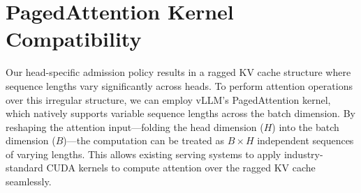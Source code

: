 \section{PagedAttention Kernel Compatibility}
\label{app:kernel}

Our head-specific admission policy results in a ragged KV cache structure where sequence lengths vary significantly across heads. To perform attention operations over this irregular structure, we can employ vLLM's PagedAttention \cite{pagedattn} kernel, which natively supports variable sequence lengths across the batch dimension. By reshaping the attention input---folding the head dimension ($H$) into the batch dimension ($B$)---the computation can be treated as $B \times H$ independent sequences of varying lengths. This allows existing serving systems to apply industry-standard CUDA kernels to compute attention over the ragged KV cache seamlessly.